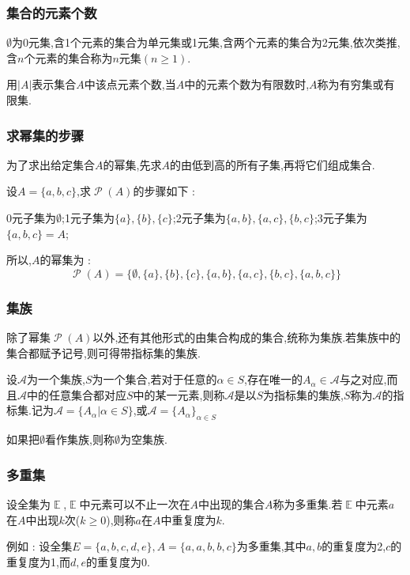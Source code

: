 \documentclass[UTF8,12pt]{ctexbook}
\newcommand{\absoluteValue}[1]{\left\lvert #1 \right\vert}
\newcommand{\powerSetOf}[1]{\powerSet (#1)}
\DeclareMathOperator{\mathEverythingCollection}{\mathbb{E}}
\DeclareMathOperator{\powerSet}{\mathcal{P}}
\begin{document}
{{{{\subsubsection{集合的元素个数}{
  $\emptyset$为$0$元集,含1个元素的集合为单元集或1元集,含两个元素的集合为2元集,依次类推,含$n$个元素的集合称为$n$元集$(n \geq 1)$.

  用$\absoluteValue{A}$表示集合$A$中该点元素个数,当$A$中的元素个数为有限数时,$A$称为有穷集或有限集.
}%

\subsubsection{求幂集的步骤}{
  为了求出给定集合$A$的幂集,先求$A$的由低到高的所有子集,再将它们组成集合.

  设$A = \{a,b,c\}$,求$\powerSetOf{A}$的步骤如下 :

  0元子集为$\emptyset$;1元子集为$\{a\},\{b\},\{c\}$;2元子集为$\{a,b\},\{a,c\},\{b,c\}$;3元子集为$\{a,b,c\} = A$;

  所以,$A$的幂集为 : $$
    \powerSetOf{A} = \{\emptyset,\{a\},\{b\},\{c\},\{a,b\},\{a,c\},\{b,c\},\{a,b,c\}\}
  $$
}%

\subsubsection{集族}{
除了幂集$\powerSetOf{A}$以外,还有其他形式的由集合构成的集合,统称为集族.若集族中的集合都赋予记号,则可得带指标集的集族.

设$\mathcal{A}$为一个集族,$S$为一个集合,若对于任意的$\alpha \in S$,存在唯一的$A_\alpha \in \mathcal{A}$与之对应,而且$\mathcal{A}$中的任意集合都对应$S$中的某一元素,则称$\mathcal{A}$是以$S$为指标集的集族,$S$称为$\mathcal{A}$的指标集.记为$\mathcal{A} = \{A_\alpha | \alpha \in S\}$,或$\mathcal{A} = \{A_\alpha\}_{\alpha \in S}$

如果把$\emptyset$看作集族,则称$\emptyset$为空集族.
}%

\subsubsection{多重集}{
  设全集为$\mathEverythingCollection$,$\mathEverythingCollection$中元素可以不止一次在$A$中出现的集合$A$称为多重集.若$\mathEverythingCollection$中元素$a$在$A$中出现$k$次($k \geq 0$),则称$a$在$A$中重复度为$k$.

  例如 : 设全集$E = \{a,b,c,d,e\},A = \{a,a,b,b,c\}$为多重集,其中$a,b$的重复度为2,$c$的重复度为1,而$d,e$的重复度为0.

}}}}}
\end{document}
